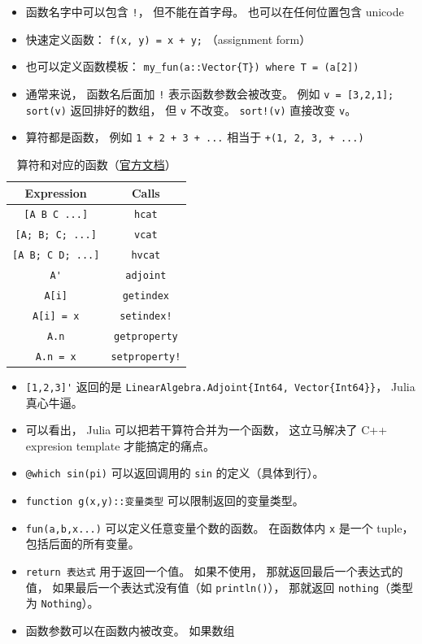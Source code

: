 
\begin{issues}
\issueDraft
\end{issues}

\begin{itemize}
\item 函数名字中可以包含 \verb`!`， 但不能在首字母。 也可以在任何位置包含 unicode
\item 快速定义函数： \verb`f(x, y) = x + y;` （assignment form）
\item 也可以定义函数模板： \verb`my_fun(a::Vector{T}) where T = (a[2])`
\item 通常来说， 函数名后面加 \verb`!` 表示函数参数会被改变。 例如 \verb`v = [3,2,1]; sort(v)` 返回排好的数组， 但 \verb`v` 不改变。 \verb`sort!(v)` 直接改变 \verb`v`。
\item 算符都是函数， 例如 \verb`1 + 2 + 3 + ...` 相当于 \verb`+(1, 2, 3, + ...)`
\end{itemize}


\begin{table}[ht]
\centering
\caption{算符和对应的函数（\href{https://docs.julialang.org/en/v1/manual/functions/}{官方文档}）}\label{tab_JuFunc_1}
\begin{tabular}{|c|c|}
\hline
Expression & Calls \\
\hline
\verb`[A B C ...]` & \verb`hcat` \\
\hline
\verb`[A; B; C; ...]` & \verb`vcat` \\
\hline
\verb`[A B; C D; ...]` & \verb`hvcat` \\
\hline
\verb`A'` & \verb`adjoint` \\
\hline
\verb`A[i]` & \verb`getindex` \\
\hline
\verb`A[i] = x` & \verb`setindex!` \\
\hline
\verb`A.n` & \verb`getproperty` \\
\hline
\verb`A.n = x` & \verb`setproperty!` \\
\hline
\end{tabular}
\end{table}

\begin{itemize}
\item \verb`[1,2,3]'` 返回的是 \verb`LinearAlgebra.Adjoint{Int64, Vector{Int64}}`， Julia 真心牛逼。
\item 可以看出， Julia 可以把若干算符合并为一个函数， 这立马解决了 C++ expresion template 才能搞定的痛点。
\item \verb`@which sin(pi)` 可以返回调用的 \verb`sin` 的定义（具体到行）。
\item \verb`function g(x,y)::变量类型` 可以限制返回的变量类型。
\item \verb`fun(a,b,x...)` 可以定义任意变量个数的函数。 在函数体内 \verb`x` 是一个 tuple， 包括后面的所有变量。
\item \verb`return 表达式` 用于返回一个值。 如果不使用， 那就返回最后一个表达式的值， 如果最后一个表达式没有值（如 \verb`println()`）， 那就返回 \verb`nothing`（类型为 \verb`Nothing`）。
\item 函数参数可以在函数内被改变。 如果数组
\end{itemize}

